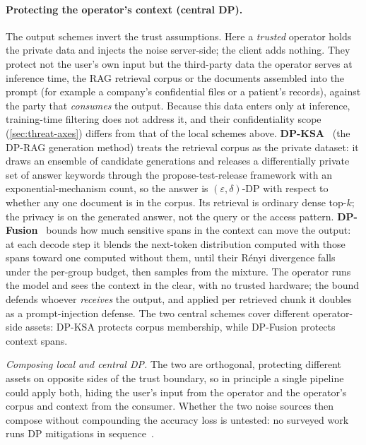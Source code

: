 \paragraph{Protecting the operator's context (central DP).}
The output schemes invert the trust assumptions. Here a \emph{trusted} operator holds the private data
and injects the noise server-side; the client adds nothing. They protect not the user's own input
but the third-party data the operator serves at inference time, the RAG retrieval corpus or the
documents assembled into the prompt (for example a company's confidential files or a patient's
records), against the party that \emph{consumes} the output. Because this data enters only at
inference, training-time filtering does not address it, and their confidentiality scope
(\cref{sec:threat-axes}) differs from that of the local schemes above. \textbf{DP-KSA}~\cite{tang_dprag} (the DP-RAG generation method) treats
the retrieval corpus as the private dataset: it draws an ensemble of candidate generations and
releases a differentially private set of answer keywords through the propose-test-release framework
with an exponential-mechanism count, so the answer is $(\varepsilon,\delta)$-DP with respect to
whether any one document is in the corpus. Its retrieval is ordinary dense top-$k$; the privacy is
on the generated answer, not the query or the access pattern. \textbf{DP-Fusion}~\cite{dp_fusion} bounds how much sensitive spans in the context can move the
output: at each decode step it blends the next-token distribution computed with those spans
toward one computed without them, until their Rényi divergence falls under the per-group
budget, then samples from the mixture. The operator runs the model and sees the context in the
clear, with no trusted hardware; the bound defends whoever \emph{receives} the output, and applied
per retrieved chunk it doubles as a prompt-injection defense. The two central schemes cover different operator-side assets: DP-KSA protects corpus membership,
while DP-Fusion protects context spans.

\begin{openproblem}
\label{op:dp-compose}
\emph{Composing local and central DP.} The two are orthogonal, protecting different assets on
opposite sides of the trust boundary, so in principle a single pipeline could apply both, hiding the
user's input from the operator and the operator's corpus and context from the consumer. Whether the
two noise sources then compose without compounding the accuracy loss is untested: no surveyed work
runs DP mitigations in sequence~\cite{bodea_sok}.
\end{openproblem}

